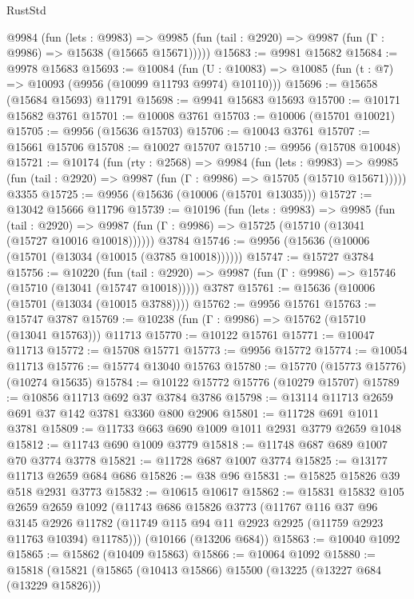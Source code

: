 \begin{lexlean}{RustStd}
\begin{coremodule}
    @9984
      (fun (lets : @9983) =>
      @9985 (fun (tail : @2920) => @9987 (fun (Γ : @9986) => @15638 (@15665 @15671)))))
@15683 := @9981 @15682
@15684 := @9978 @15683
@15693 := @10084
    (fun (U : @10083) => @10085 (fun (t : @7) => @10093 (@9956 (@10099 @11793 @9974) @10110)))
@15696 := @15658 (@15684 @15693) @11791
@15698 := @9941 @15683 @15693
@15700 := @10171 @15682 @3761
@15701 := @10008 @3761
@15703 := @10006 (@15701 @10021)
@15705 := @9956 (@15636 @15703)
@15706 := @10043 @3761
@15707 := @15661 @15706
@15708 := @10027 @15707
@15710 := @9956 (@15708 @10048)
@15721 := @10174
    (fun (rty : @2568) =>
    @9984
      (fun (lets : @9983) =>
      @9985 (fun (tail : @2920) => @9987 (fun (Γ : @9986) => @15705 (@15710 @15671)))))
    @3355
@15725 := @9956 (@15636 (@10006 (@15701 @13035)))
@15727 := @13042 @15666 @11796
@15739 := @10196
    (fun (lets : @9983) =>
    @9985
      (fun (tail : @2920) =>
      @9987 (fun (Γ : @9986) => @15725 (@15710 (@13041 (@15727 @10016 @10018))))))
    @3784
@15746 := @9956 (@15636 (@10006 (@15701 (@13034 (@10015 (@3785 @10018))))))
@15747 := @15727 @3784
@15756 := @10220
    (fun (tail : @2920) => @9987 (fun (Γ : @9986) => @15746 (@15710 (@13041 (@15747 @10018)))))
    @3787
@15761 := @15636 (@10006 (@15701 (@13034 (@10015 @3788))))
@15762 := @9956 @15761
@15763 := @15747 @3787
@15769 := @10238 (fun (Γ : @9986) => @15762 (@15710 (@13041 @15763))) @11713
@15770 := @10122 @15761
@15771 := @10047 @11713
@15772 := @15708 @15771
@15773 := @9956 @15772
@15774 := @10054 @11713
@15776 := @15774 @13040 @15763
@15780 := @15770 (@15773 @15776) (@10274 @15635)
@15784 := @10122 @15772 @15776 (@10279 @15707)
@15789 := @10856 @11713 @692 @37 @3784 @3786
@15798 := @13114 @11713 @2659 @691 @37 @142 @3781 @3360 @800 @2906
@15801 := @11728 @691 @1011 @3781
@15809 := @11733 @663 @690 @1009 @1011 @2931 @3779 @2659 @1048
@15812 := @11743 @690 @1009 @3779
@15818 := @11748 @687 @689 @1007 @70 @3774 @3778
@15821 := @11728 @687 @1007 @3774
@15825 := @13177 @11713 @2659 @684 @686
@15826 := @38 @96
@15831 := @15825 @15826 @39 @518 @2931 @3773
@15832 := @10615 @10617
@15862 := @15831
    @15832
    @105
    @2659
    @2659
    @1092
    (@11743
      @686
      @15826
      @3773
      (@11767
        @116
        @37
        @96
        @3145
        @2926
        @11782
        (@11749 @115 @94 @11 @2923 @2925 (@11759 @2923 @11763 @10394) @11785)))
    (@10166 (@13206 @684))
@15863 := @10040 @1092
@15865 := @15862 (@10409 @15863)
@15866 := @10064 @1092
@15880 := @15818
    (@15821
      (@15865
        (@10413 @15866)
        @15500
        (@13225 (@13227 @684 (@13229 @15826)))

\end{coremodule}
\end{lexlean}
